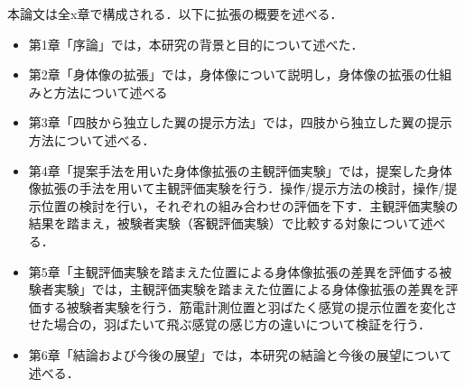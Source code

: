         本論文は全x章で構成される．以下に拡張の概要を述べる．

        \begin{itemize}
                \item 第1章「序論」では，本研究の背景と目的について述べた．
                \item 第2章「身体像の拡張」では，身体像について説明し，身体像の拡張の仕組みと方法について述べる
                \item 第3章「四肢から独立した翼の提示方法」では，四肢から独立した翼の提示方法について述べる．
                \item 第4章「提案手法を用いた身体像拡張の主観評価実験」では，提案した身体像拡張の手法を用いて主観評価実験を行う．操作/提示方法の検討，操作/提示位置の検討を行い，それぞれの組み合わせの評価を下す．主観評価実験の結果を踏まえ，被験者実験（客観評価実験）で比較する対象について述べる．
                \item 第5章「主観評価実験を踏まえた位置による身体像拡張の差異を評価する被験者実験」では，主観評価実験を踏まえた位置による身体像拡張の差異を評価する被験者実験を行う．筋電計測位置と羽ばたく感覚の提示位置を変化させた場合の，羽ばたいて飛ぶ感覚の感じ方の違いについて検証を行う．
                \item 第6章「結論および今後の展望」では，本研究の結論と今後の展望について述べる．
        \end{itemize}
        
        


        
